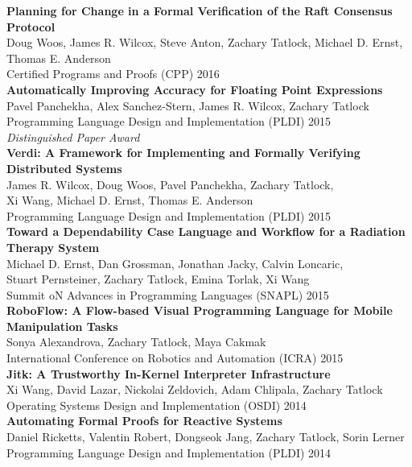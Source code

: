\documentclass[10pt]{article}
\begin{document}
\textbf{%
Planning for Change in a Formal Verification of the Raft Consensus Protocol
} \\
Doug Woos, James R. Wilcox, Steve Anton, Zachary Tatlock, Michael D. Ernst, Thomas E. Anderson \\
Certified Programs and Proofs (CPP) 2016 \\

\textbf{%
Automatically Improving Accuracy for Floating Point Expressions
} \\
Pavel Panchekha, Alex Sanchez-Stern, James R. Wilcox, Zachary Tatlock \\
Programming Language Design and Implementation (PLDI) 2015 \\
\textit{Distinguished Paper Award} \\

\textbf{%
Verdi: A Framework for Implementing and Formally Verifying Distributed Systems
} \\
James R. Wilcox, Doug Woos, Pavel Panchekha, Zachary Tatlock, \\
Xi Wang, Michael D. Ernst, Thomas E. Anderson \\
Programming Language Design and Implementation (PLDI) 2015 \\

\textbf{%
Toward a Dependability Case Language and Workflow for a Radiation Therapy System
} \\
Michael D. Ernst, Dan Grossman, Jonathan Jacky, Calvin Loncaric, \\
Stuart Pernsteiner, Zachary Tatlock, Emina Torlak, Xi Wang \\
Summit oN Advances in Programming Languages (SNAPL) 2015 \\

\textbf{%
RoboFlow: A Flow-based Visual Programming Language for Mobile Manipulation Tasks
} \\
Sonya Alexandrova, Zachary Tatlock, Maya Cakmak \\
International Conference on Robotics and Automation (ICRA) 2015 \\

\textbf{%
Jitk: A Trustworthy In-Kernel Interpreter Infrastructure
} \\
Xi Wang, David Lazar, Nickolai Zeldovich, Adam Chlipala, Zachary Tatlock \\
Operating Systems Design and Implementation (OSDI) 2014 \\

\textbf{%
Automating Formal Proofs for Reactive Systems
} \\
Daniel Ricketts, Valentin Robert, Dongseok Jang, Zachary Tatlock, Sorin Lerner \\
Programming Language Design and Implementation (PLDI) 2014 \\
\end{document}
